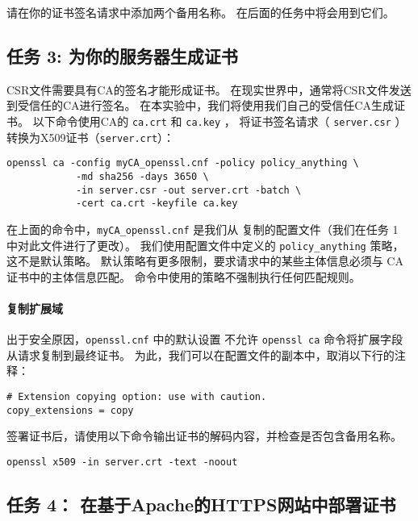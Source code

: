 请在你的证书签名请求中添加两个备用名称。
在后面的任务中将会用到它们。


\subsection{任务 3: 为你的服务器生成证书}

CSR文件需要具有CA的签名才能形成证书。
在现实世界中，通常将CSR文件发送到受信任的CA进行签名。
在本实验中，我们将使用我们自己的受信任CA生成证书。
以下命令使用CA的 {\tt ca.crt} 和 {\tt ca.key} ，
将证书签名请求（ {\tt server.csr} ）转换为X509证书（{\tt server.crt}）：

\begin{lstlisting}
openssl ca -config myCA_openssl.cnf -policy policy_anything \
            -md sha256 -days 3650 \
            -in server.csr -out server.crt -batch \
            -cert ca.crt -keyfile ca.key
\end{lstlisting}

在上面的命令中，\texttt{myCA\_openssl.cnf} 是我们从 
复制的配置文件（我们在任务 1 中对此文件进行了更改）。
我们使用配置文件中定义的 \texttt{policy\_anything} 策略，这不是默认策略。
默认策略有更多限制，要求请求中的某些主体信息必须与 CA 证书中的主体信息匹配。
命令中使用的策略不强制执行任何匹配规则。

\paragraph{复制扩展域}
出于安全原因，\texttt{openssl.cnf} 中的默认设置
不允许 \texttt{openssl ca} 命令将扩展字段从请求复制到最终证书。
为此，我们可以在配置文件的副本中，取消以下行的注释：

\begin{lstlisting}
# Extension copying option: use with caution.
copy_extensions = copy
\end{lstlisting}

签署证书后，请使用以下命令输出证书的解码内容，并检查是否包含备用名称。

\begin{lstlisting}
openssl x509 -in server.crt -text -noout
\end{lstlisting}



\subsection{任务 4： 在基于Apache的HTTPS网站中部署证书}

